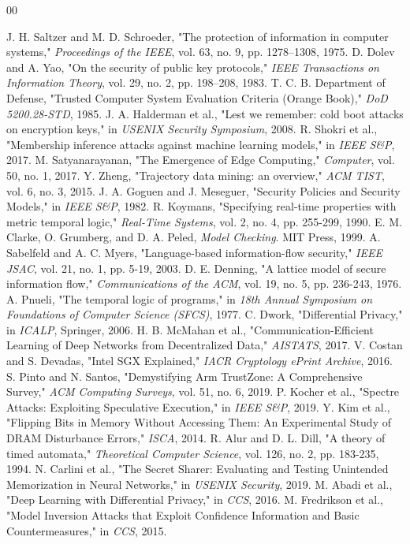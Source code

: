 \documentclass[conference]{IEEEtran}
\begin{document}
\begin{thebibliography}{00}

 J. H. Saltzer and M. D. Schroeder, "The protection of information in computer systems," \textit{Proceedings of the IEEE}, vol. 63, no. 9, pp. 1278--1308, 1975.
 D. Dolev and A. Yao, "On the security of public key protocols," \textit{IEEE Transactions on Information Theory}, vol. 29, no. 2, pp. 198--208, 1983.
 T. C. B. Department of Defense, "Trusted Computer System Evaluation Criteria (Orange Book)," \textit{DoD 5200.28-STD}, 1985.
 J. A. Halderman et al., "Lest we remember: cold boot attacks on encryption keys," in \textit{USENIX Security Symposium}, 2008.
 R. Shokri et al., "Membership inference attacks against machine learning models," in \textit{IEEE S\&P}, 2017.
 M. Satyanarayanan, "The Emergence of Edge Computing," \textit{Computer}, vol. 50, no. 1, 2017.
 Y. Zheng, "Trajectory data mining: an overview," \textit{ACM TIST}, vol. 6, no. 3, 2015.
 J. A. Goguen and J. Meseguer, "Security Policies and Security Models," in \textit{IEEE S\&P}, 1982.
 R. Koymans, "Specifying real-time properties with metric temporal logic," \textit{Real-Time Systems}, vol. 2, no. 4, pp. 255-299, 1990.
 E. M. Clarke, O. Grumberg, and D. A. Peled, \textit{Model Checking}. MIT Press, 1999.
 A. Sabelfeld and A. C. Myers, "Language-based information-flow security," \textit{IEEE JSAC}, vol. 21, no. 1, pp. 5-19, 2003.
 D. E. Denning, "A lattice model of secure information flow," \textit{Communications of the ACM}, vol. 19, no. 5, pp. 236-243, 1976.
 A. Pnueli, "The temporal logic of programs," in \textit{18th Annual Symposium on Foundations of Computer Science (SFCS)}, 1977.
 C. Dwork, "Differential Privacy," in \textit{ICALP}, Springer, 2006.
 H. B. McMahan et al., "Communication-Efficient Learning of Deep Networks from Decentralized Data," \textit{AISTATS}, 2017.
 V. Costan and S. Devadas, "Intel SGX Explained," \textit{IACR Cryptology ePrint Archive}, 2016.
 S. Pinto and N. Santos, "Demystifying Arm TrustZone: A Comprehensive Survey," \textit{ACM Computing Surveys}, vol. 51, no. 6, 2019.
 P. Kocher et al., "Spectre Attacks: Exploiting Speculative Execution," in \textit{IEEE S\&P}, 2019.
 Y. Kim et al., "Flipping Bits in Memory Without Accessing Them: An Experimental Study of DRAM Disturbance Errors," \textit{ISCA}, 2014.
 R. Alur and D. L. Dill, "A theory of timed automata," \textit{Theoretical Computer Science}, vol. 126, no. 2, pp. 183-235, 1994.
 N. Carlini et al., "The Secret Sharer: Evaluating and Testing Unintended Memorization in Neural Networks," in \textit{USENIX Security}, 2019.
 M. Abadi et al., "Deep Learning with Differential Privacy," in \textit{CCS}, 2016.
 M. Fredrikson et al., "Model Inversion Attacks that Exploit Confidence Information and Basic Countermeasures," in \textit{CCS}, 2015.


\end{thebibliography}
\end{document}
